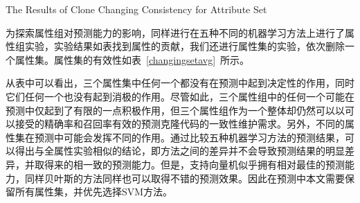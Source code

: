 
{The Results of Clone Changing Consistency for Attribute Set}

为探索属性组对预测能力的影响，同样进行在五种不同的机器学习方法上进行了属性组实验，实验结果如表找到属性的贡献，我们还进行属性集的实验，依次删除一个属性集。属性集的有效性如表~\ref{changingsetavg}~所示。%

从表中可以看出，三个属性集中任何一个都没有在预测中起到决定性的作用，同时它们任何一个也没有起到消极的作用。尽管如此，三个属性组中的任何一个可能在预测中仅起到了有限的一点积极作用，但三个属性组作为一个整体却仍然可以以可以接受的精确率和召回率有效的预测克隆代码的一致性维护需求。另外，不同的属性集在预测中可能会发挥不同的作用。通过比较五种机器学习方法的预测结果，可以得出与全属性实验相似的结论，即方法之间的差异并不会导致预测结果的明显差异，并取得来的相一致的预测能力。但是，支持向量机似乎拥有相对最佳的预测能力，同样贝叶斯的方法同样也可以取得不错的预测效果。因此在预测中本文需要保留所有属性集，并优先选择SVM方法。

